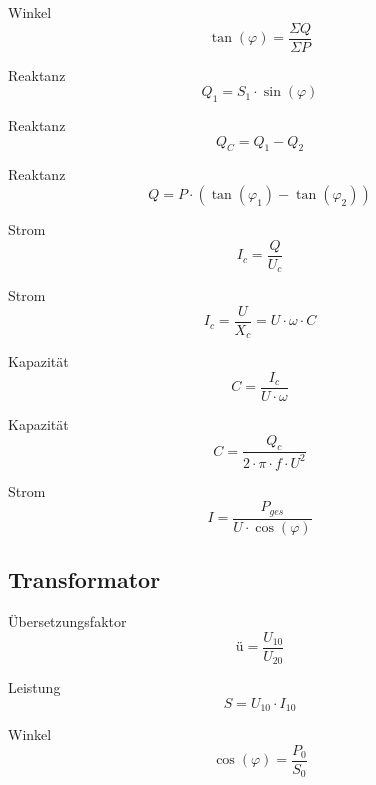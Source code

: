 \documentclass[11pt, a4paper, draft, fleqn, twocolumn]{article}
\numberwithin{equation}{subsection}
\begin{document}
\noindent Winkel
\begin{equation}
    \tan(\varphi) = \frac{\Sigma Q}{\Sigma P}
\end{equation}

\noindent Reaktanz
\begin{equation}
    Q_1 = S_1 \cdot \sin(\varphi)
\end{equation}

\noindent Reaktanz
\begin{equation}
    Q_C = Q_1 - Q_2
\end{equation}

\noindent Reaktanz
\begin{equation}
    Q = P \cdot (\tan(\varphi_1) - \tan(\varphi_2))
\end{equation}

\noindent Strom
\begin{equation}
    I_c = \frac{Q}{U_c}
\end{equation}

\noindent Strom
\begin{equation}
    I_c = \frac{U}{X_c} = U \cdot \omega \cdot C
\end{equation}

\noindent Kapazität
\begin{equation}
    C = \frac{I_c}{U \cdot \omega}
\end{equation}

\noindent Kapazität
\begin{equation}
    C = \frac{Q_c}{2 \cdot \pi \cdot f \cdot U^2}
\end{equation}

\noindent Strom
\begin{equation}
    I = \frac{P_{ges}}{U \cdot \cos(\varphi)}
\end{equation}


\subsection{Transformator}

Übersetzungsfaktor
\begin{equation}
    \text{ü} = \frac{U_{10}}{U_{20}}
\end{equation}

\noindent Leistung
\begin{equation}
    S = U_{10} \cdot I_{10}
\end{equation}

\noindent Winkel
\begin{equation}
    \cos(\varphi) = \frac{P_{0}}{S_{0}}
\end{equation}
\end{document}
